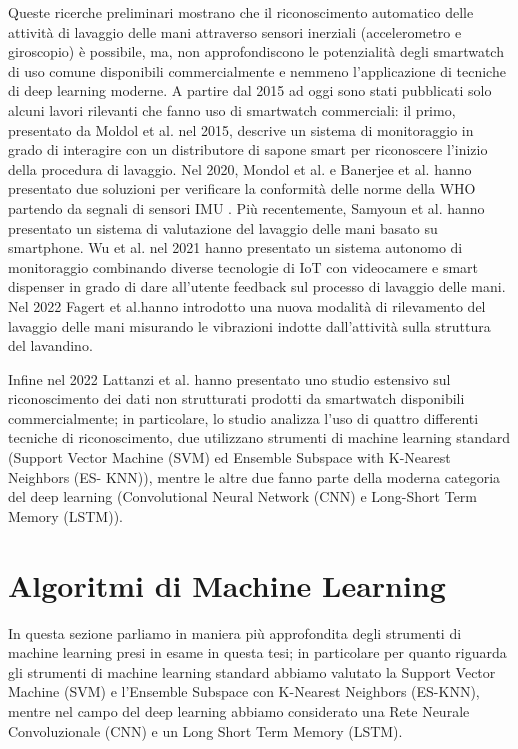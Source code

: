 Queste ricerche preliminari mostrano che il riconoscimento automatico delle attività di lavaggio delle mani attraverso sensori inerziali (accelerometro e giroscopio) è possibile, ma, non approfondiscono le potenzialità degli smartwatch di uso comune disponibili commercialmente e nemmeno l'applicazione di tecniche di deep learning moderne.
A partire dal 2015 ad oggi sono stati pubblicati solo alcuni lavori rilevanti che fanno uso di smartwatch commerciali: il primo, presentato da Moldol et al. nel 2015, descrive un sistema di monitoraggio in grado di interagire con un distributore di sapone smart per riconoscere l'inizio della procedura di lavaggio\cite{mondol2015harmony}. Nel 2020, Mondol et al. e Banerjee et al. hanno presentato due soluzioni per verificare la conformità delle norme della WHO partendo da segnali di sensori IMU \cite{mondol2020hawad}\cite{banerjee2020hand}. Più recentemente, Samyoun et al. hanno presentato un sistema di valutazione del lavaggio delle mani basato su smartphone\cite{samyoun2021iwash}. Wu et al. nel 2021 hanno presentato un sistema autonomo di monitoraggio combinando diverse tecnologie di IoT con videocamere e smart dispenser in grado di dare all'utente feedback sul processo di lavaggio delle mani. Nel 2022 Fagert et al.hanno introdotto una nuova modalità di rilevamento del lavaggio delle mani misurando le vibrazioni indotte dall'attività sulla struttura del lavandino\cite{fagert2022clean}.

Infine nel 2022 Lattanzi et al. hanno presentato uno studio estensivo sul riconoscimento dei dati non strutturati prodotti da smartwatch disponibili commercialmente\cite{lattanzi2022unstructured}; in particolare, lo studio analizza l'uso di quattro differenti tecniche di riconoscimento, due utilizzano strumenti di machine learning standard (Support Vector Machine (SVM) ed Ensemble Subspace with K-Nearest Neighbors (ES- KNN)), mentre le altre due fanno parte della moderna categoria del deep learning (Convolutional Neural Network (CNN) e Long-Short Term Memory (LSTM)).

\section{Algoritmi di Machine Learning}

In questa sezione parliamo in maniera più approfondita degli strumenti di machine learning presi in esame in questa tesi; in particolare per quanto riguarda gli strumenti di machine learning standard abbiamo valutato la Support Vector Machine (SVM) e l'Ensemble Subspace con K-Nearest Neighbors (ES-KNN), mentre nel campo del deep learning abbiamo considerato una Rete Neurale Convoluzionale (CNN) e un Long Short Term Memory (LSTM).

